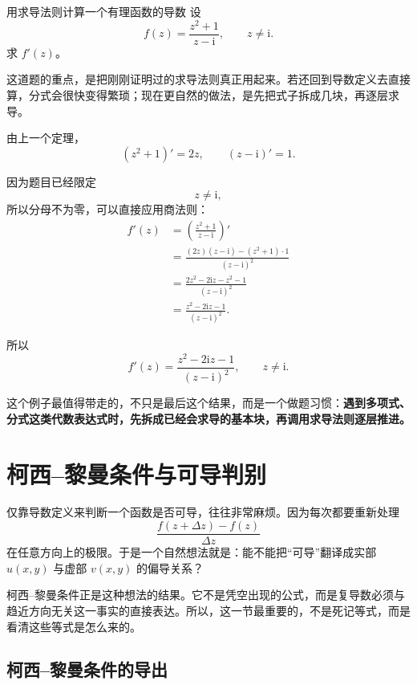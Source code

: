 \begin{lizi}{用求导法则计算一个有理函数的导数}{}
设
\[
    f(z)=\frac{z^2+1}{z-\mathrm{i}},\qquad z\neq \mathrm{i}.
\]
求 $f'(z)$。

\begin{jie}
这道题的重点，是把刚刚证明过的求导法则真正用起来。若还回到导数定义去直接算，分式会很快变得繁琐；现在更自然的做法，是先把式子拆成几块，再逐层求导。

由上一个定理，
\[
    (z^2+1)'=2z,\qquad (z-\mathrm{i})'=1.
\]

因为题目已经限定
\[
    z\neq \mathrm{i},
\]
所以分母不为零，可以直接应用商法则：
\begin{align*}
    f'(z)
    &=\left(\frac{z^2+1}{z-\mathrm{i}}\right)'\\
    &=\frac{(2z)(z-\mathrm{i})-(z^2+1)\cdot 1}{(z-\mathrm{i})^2}\\
    &=\frac{2z^2-2\mathrm{i}z-z^2-1}{(z-\mathrm{i})^2}\\
    &=\frac{z^2-2\mathrm{i}z-1}{(z-\mathrm{i})^2}.
\end{align*}

所以
\[
    f'(z)=\frac{z^2-2\mathrm{i}z-1}{(z-\mathrm{i})^2},\qquad z\neq \mathrm{i}.
\]

这个例子最值得带走的，不只是最后这个结果，而是一个做题习惯：\textbf{遇到多项式、分式这类代数表达式时，先拆成已经会求导的基本块，再调用求导法则逐层推进。}
\end{jie}
\end{lizi}

\section{柯西--黎曼条件与可导判别}

\begin{wulibj}[为什么需要这一节]
仅靠导数定义来判断一个函数是否可导，往往非常麻烦。因为每次都要重新处理
\[
    \frac{f(z+\Delta z)-f(z)}{\Delta z}
\]
在任意方向上的极限。于是一个自然想法就是：能不能把``可导''翻译成实部 $u(x,y)$ 与虚部 $v(x,y)$ 的偏导关系？

柯西--黎曼条件正是这种想法的结果。它不是凭空出现的公式，而是复导数必须与趋近方向无关这一事实的直接表达。所以，这一节最重要的，不是死记等式，而是看清这些等式是怎么来的。
\end{wulibj}

\subsection{柯西--黎曼条件的导出}

